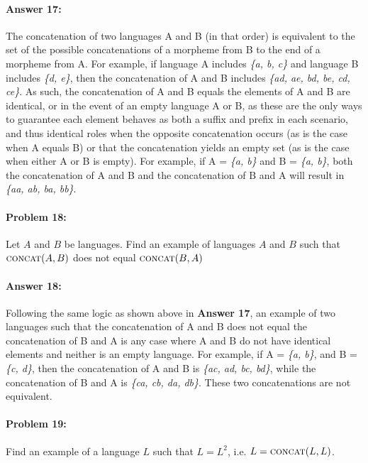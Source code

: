 \documentclass[10pt]{article}
\begin{document}
\paragraph{Answer 17:} The concatenation of two languages A and B (in that order) is equivalent to the set of the possible concatenations of a morpheme from B to the end of a morpheme from A. For example, if language A includes \textit{\{a, b, c\}} and language B includes \textit{\{d, e\}}, then the concatenation of A and B includes \textit{\{ad, ae, bd, be, cd, ce\}}. As such, the concatenation of A and B equals the elements of A and B are identical, or in the event of an empty language A or B, as these are the only ways to guarantee each element behaves as both a suffix and prefix in each scenario, and thus identical roles when the opposite concatenation occurs (as is the case when A equals B) or that the concatenation yields an empty set (as is the case when either A or B is empty). For example, if A = \textit{\{a, b\}} and B = \textit{\{a, b\}}, both the concatenation of A and B and the concatenation of B and A will result in \textit{\{aa, ab, ba, bb\}}.

\hrulefill
\paragraph{Problem 18:}
Let $A$ and $B$ be languages. Find an example of languages $A$ and $B$
such that $\textsc{concat}(A,B)$ does not equal $\textsc{concat}(B,A)$

\paragraph{Answer 18:} Following the same logic as shown above in \textbf{Answer 17}, an example of two languages such that the concatenation of A and B does not equal the concatenation of B and A is any case where A and B do not have identical elements and neither is an empty language. For example, if A = \textit{\{a, b\}}, and B = \textit{\{c, d\}}, then the concatenation of A and B is \textit{\{ac, ad, bc, bd\}}, while the concatenation of B and A is \textit{\{ca, cb, da, db\}}. These two concatenations are not equivalent.

\hrulefill
\paragraph{Problem 19:}
Find an example of a language $L$ such that $L=L^2$,
i.e. $L=\textsc{concat}(L,L)$.
\end{document}

